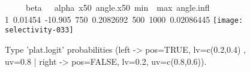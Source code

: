 \documentclass[letterpaper, 12pt]{article}
\newenvironment{Houtput}%
{}%
{}%
\newcommand{\hlstd}[1]{\textcolor[rgb]{0,0,0}{#1}}%
\begin{document}
\begin{figure}[h]
\vspace{-20pt}
\begin{center}
\begin{Houtput}
\ttfamily\noindent
{\ }{\ }{\ }{\ }{\ }beta{\ }{\ }{\ }alpha{\ }x50{\ }angle.x50{\ }min{\ }{\ }max{\ }angle.infl\hspace*{\fill}\\
\hlstd{}1{\ }0.01454{\ }-10.905{\ }750{\ }0.2082692{\ }500{\ }1000{\ }0.02086445\hspace*{\fill}\hlstd{}\mbox{}
\normalfont
\end{Houtput}
\texttt{[image: selectivity-033]}
\end{center}
\vspace{-30pt}
\caption{Type 'plat.logit' probabilities (left -> pos=TRUE, lv=c(0.2,0.4) , uv=0.8 | right -> pos=FALSE, lv=0.2, uv=c(0.8,0.6)).}
\vspace{-10pt}
\label{fig16}
\end{figure}







        
        
\end{document}
